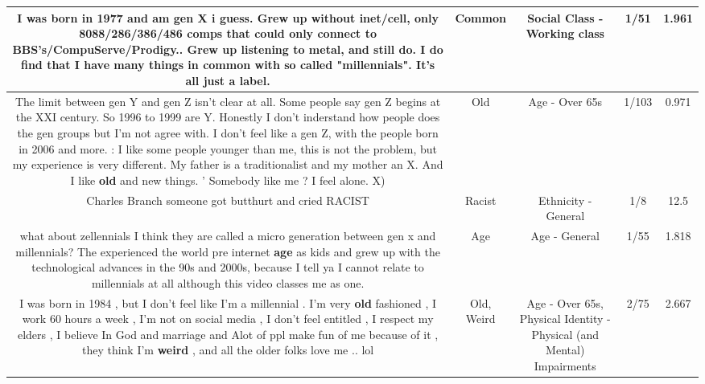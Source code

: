 \documentclass[11pt]{article}
\newlength\mylength
\begin{document}
\begin{center}
\begin{longtable}{|C{.65\mylength}|C{.30\mylength}|C{.12\mylength}|C{.12\mylength}|C{.12\mylength}|}
  \small I was born in 1977 and am gen X i guess. Grew up without inet/cell, only 8088/286/386/486 comps that could only connect to BBS's/CompuServe/Prodigy.. Grew up listening to metal, and still do. I do find that I have many things in \textbf{common} with so called "millennials". It's all just a label.\normalsize   & Common & Social Class - Working class & 1/51 & 1.961 \\  \hline
  \small The limit between gen Y and gen Z isn't clear at all. Some people say gen Z begins at the XXI century. So 1996 to 1999 are Y.  Honestly I don't inderstand how people does the gen groups but I'm not agree with.  I don't feel like a gen Z, with the people born in 2006 and more. : I like some people younger than me, this is not the problem, but my experience is very different.  My father is a traditionalist and my mother an X.  And I like \textbf{old} and new things.    ' Somebody like me ? I feel alone.  X)\normalsize   & Old & Age - Over 65s & 1/103 & 0.971 \\  \hline
  \small Charles Branch someone got butthurt and cried RACIST\normalsize   & Racist & Ethnicity - General & 1/8 & 12.5 \\  \hline
  \small what about zellennials I think they are called a micro generation between gen x and millennials? The experienced the world pre internet \textbf{age} as kids and grew up with the technological advances in the 90s and 2000s, because I tell ya I cannot relate to millennials at all although this video classes me as one.\normalsize   & Age & Age - General & 1/55 & 1.818 \\  \hline
  \small I was born in 1984 , but I don't feel like I'm a millennial . I'm very \textbf{old} fashioned , I work 60 hours a week , I'm not on social media , I don't feel entitled , I respect my elders , I believe In God and marriage and Alot of ppl make fun of me because of it , they think I'm \textbf{weird} , and all the older folks love me .. lol\normalsize   & Old, Weird & Age - Over 65s, Physical Identity - Physical (and Mental) Impairments & 2/75 & 2.667 \\  \hline

\end{longtable}
\end{center}
\end{document}
